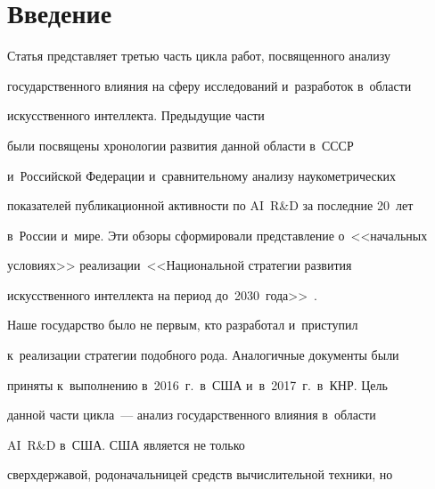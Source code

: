 









    \thispagestyle{headings}





    \vspace*{-12pt}





   \section{Введение}





  Статья представляет третью часть цик\-ла работ, посвященного анализу


государственного влияния на сферу исследований и~разработок в~об\-ласти


искусственного интеллекта. Предыдущие части~\cite{1-bor, 2-bor}


были посвящены хронологии развития данной области в~СССР


и~Российской Федерации и~сравнительному анализу наукометрических


показателей публикационной активности по AI~R\&D за последние 20~лет


в~России и~мире. Эти обзоры сформировали пред\-став\-ле\-ние о~<<начальных


условиях>> реализации~<<Национальной стратегии развития


искусственного интеллекта на период до~2030~года>>~\cite{3-bor}.





  Наше государство было не первым, кто разработал и~приступил


к~реализации стратегии подобного рода. Аналогичные документы были


приняты к~выполнению в~2016~г.\ в~США и~в~2017~г.\ в~КНР. Цель


данной части цикла~--- анализ государственного влияния в~об\-ласти


AI~R\&D в~США. США является не только


сверхдержавой, родоначальницей средств вычислительной техники, но


